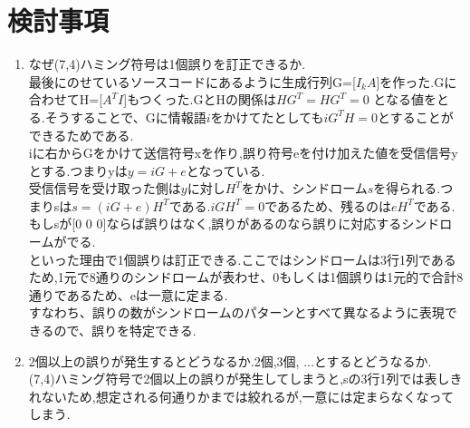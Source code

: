 \documentclass[12pt]{jarticle}
\begin{document}
\section{検討事項}
\begin{enumerate}
\item なぜ(7,4)ハミング符号は1個誤りを訂正できるか.\\
  最後にのせているソースコードにあるように生成行列G=[$I_k A$]を作った.Gに合わせてH=[$A^T I$]もつくった.GとHの関係は$HG^T = HG^T = 0$ となる値をとる.そうすることで、Gに情報語$i$をかけてたとしても$iG^TH=0$とすることができるためである.\\
  iに右からGをかけて送信符号xを作り,誤り符号eを付け加えた値を受信信号yとする.つまりyは$y=iG + e$となっている.\\
  受信信号を受け取った側は$y$に対し$H^T$をかけ、シンドローム$s$を得られる.つまりsは$s=(iG + e)H^T$である.$iGH^T=0$であるため、残るのは$eH^T$である.もしsが[0 0 0]ならば誤りはなく,誤りがあるのなら誤りに対応するシンドロームがでる.\\
  といった理由で1個誤りは訂正できる.ここではシンドロームは3行1列であるため,1元で8通りのシンドロームが表わせ、0もしくは1個誤りは1元的で合計8通りであるため、eは一意に定まる.\\
 すなわち、誤りの数がシンドロームのパターンとすべて異なるように表現できるので、誤りを特定できる.

\item 2個以上の誤りが発生するとどうなるか.2個,3個, ...とするとどうなるか.\\
  (7,4)ハミング符号で2個以上の誤りが発生してしまうと,sの3行1列では表しきれないため,想定される何通りかまでは絞れるが,一意には定まらなくなってしまう.

\end{enumerate}
\end{document}
